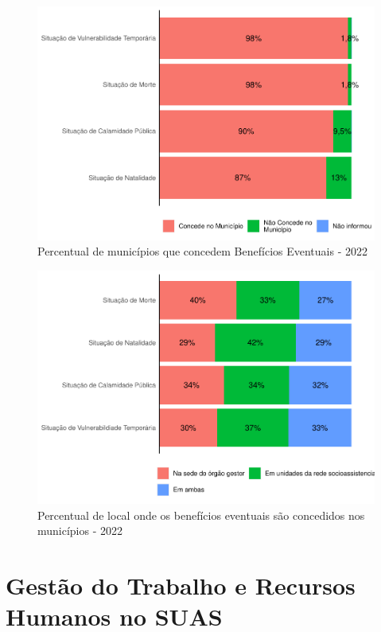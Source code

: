 \documentclass[
  brazilian]{report}
\begin{document}
\begin{figure}
\includegraphics{Censo-SUAS-2022_files/figure-latex/be-munic-1} \caption[Percentual de municípios que concedem Benefícios Eventuais - 2022]{Percentual de municípios que concedem Benefícios Eventuais - 2022}\label{fig:be-munic}
\end{figure}

\begin{figure}
\includegraphics{Censo-SUAS-2022_files/figure-latex/be-local-1} \caption[Percentual de local onde os benefícios eventuais são concedidos nos municípios - 2022]{Percentual de local onde os benefícios eventuais são concedidos nos municípios - 2022}\label{fig:be-local}
\end{figure}

\hypertarget{gestuxe3o-do-trabalho-e-recursos-humanos-no-suas}{%
\chapter{Gestão do Trabalho e Recursos Humanos no
SUAS}\label{gestuxe3o-do-trabalho-e-recursos-humanos-no-suas}}
\end{document}
